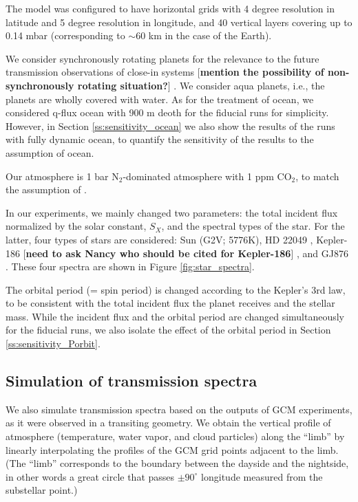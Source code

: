 \documentclass[11pt,numberedappendix,twocolappendix,]{emulateapj}
\def\memo#1{\color{red}$[${\bf #1}$]$ \color{black}}
\begin{document}
The model was configured to have horizontal grids with 4 degree resolution in latitude and 5 degree resolution in longitude, and 40 vertical layers covering up to 0.14 mbar (corresponding to $\sim 60$ km in the case of the Earth). 

We consider synchronously rotating planets for the relevance to the future transmission observations of close-in systems \memo{mention the possibility of non-synchronously rotating situation?}. 
We consider aqua planets, i.e., the planets are wholly covered with water. 
As for the treatment of ocean, we considered q-flux ocean with 900 m deoth for the fiducial runs for simplicity. However, in Section \ref{ss:sensitivity_ocean} we also show the results of the runs with fully dynamic ocean, to quantify the sensitivity of the results to the assumption of ocean. 

Our atmosphere is 1 bar N$_2$-dominated atmosphere with 1 ppm CO$_2$, to match the assumption of \citet{Kopparapu2016}. 

In our experiments, we mainly changed two parameters: the total incident flux normalized by the solar constant, $S_X$, and the spectral types of the star. 
For the latter, four types of stars are considered: Sun (G2V; 5776K), HD 22049 \citep[][K2V, 5084K, $0.82M_{\odot }$, $0.73R_{\odot }$]{Segura2003}, Kepler-186 \citep[][M1V, 3755K, $0.54M_{\odot }$, $0.52R_{\odot }$]{}\memo{need to ask Nancy who should be cited for Kepler-186}, and GJ876 \citep[][M4V, 3473K, $0.334M_{\odot }$, $0.36R_{\odot }$]{Domagal-Goldman2014}. 
These four spectra are shown in Figure \ref{fig:star_spectra}. 

The orbital period (= spin period) is changed according to the Kepler's 3rd law, to be consistent with the total incident flux the planet receives and the stellar mass. While the incident flux and the orbital period are changed simultaneously for the fiducial runs, we also isolate the effect of the orbital period in Section \ref{ss:sensitivity_Porbit}. 




\subsection{Simulation of transmission spectra}

We also simulate transmission spectra based on the outputs of GCM experiments, as it were observed in a transiting geometry. 
We obtain the vertical profile of atmosphere (temperature, water vapor, and cloud particles) along the ``limb'' by linearly interpolating the profiles of the GCM grid points adjacent to the limb. 
(The ``limb'' corresponds to the boundary between the dayside and the nightside, in other words a great circle that passes $\pm 90^{\circ} $ longitude measured from the substellar point.)
\end{document}
